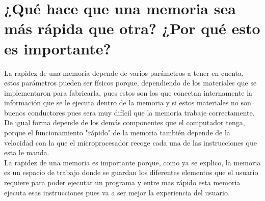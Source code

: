 \documentclass{article}
\begin{document}
\section{¿Qué hace que una memoria sea más rápida que otra? ¿Por qué esto es importante?} \label{contenido}
        \Large
        La rapidez de una memoria depende de varios parámetros a tener en cuenta, estos parámetros pueden ser físicos porque, dependiendo de los materiales que se implementaron para fabricarla, pues estos son los que conectan internamente la información que se le ejecuta dentro de la memoria y si estos materiales no son buenos conductores pues sera muy difícil que la memoria trabaje correctamente.\\
        De igual forma depende de los demás componentes que el computador tenga, porque el funcionamiento "rápido" de la memoria también depende de la velocidad con la que el microprocesador recoge cada una de las instrucciones que esta le manda.\\
        La rapidez de una memoria es importante porque, como ya se explico, la memoria es un espacio de trabajo donde se guardan los diferentes elementos que el usuario requiere para poder ejecutar un programa y entre mas rápido esta memoria ejecuta esas instrucciones pues va a ser mejor la experiencia del usuario.
        
\end{document}

